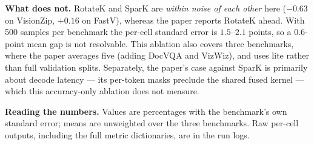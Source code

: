 \documentclass[10pt]{article}
\begin{document}
\textbf{What does not.} RotateK and SparK are \emph{within noise of each other} here
($-0.63$ on VisionZip, $+0.16$ on FastV), whereas the paper reports RotateK ahead.
With 500 samples per benchmark the per-cell standard error is $1.5$--$2.1$ points, so a
$0.6$-point mean gap is not resolvable. This ablation also covers three benchmarks,
where the paper averages five (adding DocVQA and VizWiz), and uses lite rather than full
validation splits. Separately, the paper's case against SparK is primarily about decode
latency --- its per-token masks preclude the shared fused kernel --- which this
accuracy-only ablation does not measure.

\textbf{Reading the numbers.} Values are percentages with the benchmark's own standard
error; means are unweighted over the three benchmarks. Raw per-cell outputs, including
the full metric dictionaries, are in the run logs.
\end{document}
